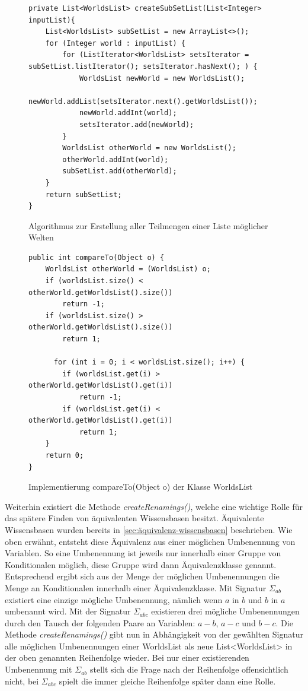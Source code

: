 \documentclass[12pt,a4paper]{article}
\begin{document}
\begin{figure}
\begin{lstlisting}
private List<WorldsList> createSubSetList(List<Integer> inputList){
    List<WorldsList> subSetList = new ArrayList<>();
    for (Integer world : inputList) {
        for (ListIterator<WorldsList> setsIterator = subSetList.listIterator(); setsIterator.hasNext(); ) {
            WorldsList newWorld = new WorldsList();
            newWorld.addList(setsIterator.next().getWorldsList());
            newWorld.addInt(world);
            setsIterator.add(newWorld);
        }
        WorldsList otherWorld = new WorldsList();
        otherWorld.addInt(world);
        subSetList.add(otherWorld);
    }
    return subSetList;
}
\end{lstlisting}
\caption{Algorithmus zur Erstellung aller Teilmengen einer Liste möglicher Welten}
\label{code:subsets}
\end{figure}



\begin{figure}
\begin{lstlisting}
public int compareTo(Object o) {
    WorldsList otherWorld = (WorldsList) o;
    if (worldsList.size() < otherWorld.getWorldsList().size())
        return -1;
    if (worldsList.size() > otherWorld.getWorldsList().size())
        return 1;
          
      for (int i = 0; i < worldsList.size(); i++) {
        if (worldsList.get(i) > otherWorld.getWorldsList().get(i))
            return -1;
        if (worldsList.get(i) < otherWorld.getWorldsList().get(i))
            return 1;
    }
    return 0;
}
\end{lstlisting}
\caption{Implementierung compareTo(Object o) der Klasse WorldsList}
\label{code:compare-worldslist}
\end{figure}


Weiterhin existiert die Methode \textit{createRenamings()}, welche eine wichtige Rolle für das spätere Finden von äquivalenten Wissensbasen besitzt. Äquivalente Wissensbasen wurden bereits in  \autoref{sec:äquivalenz-wissensbasen} beschrieben. Wie oben erwähnt, entsteht diese Äquivalenz aus einer möglichen Umbenennung von Variablen. So eine Umbenennung ist jeweils nur innerhalb einer Gruppe von Konditionalen möglich, diese Gruppe wird dann Äquivalenzklasse genannt. Entsprechend ergibt sich aus der Menge der möglichen Umbenennungen die Menge an Konditionalen innerhalb einer Äquivalenzklasse. Mit Signatur $\Sigma_{ab}$ existiert eine einzige mögliche Umbenennung, nämlich wenn $a$ in $b$ und $b$ in $a$ umbenannt wird. Mit der Signatur $\Sigma_{abc}$ existieren drei mögliche Umbenennungen durch den Tausch der folgenden Paare an Variablen: $a-b$, $a-c$ und $b-c$. Die Methode \textit{createRenamings()} gibt nun in Abhängigkeit von der gewählten Signatur alle möglichen Umbenennungen einer WorldsList als neue List<WorldsList> in der oben genannten Reihenfolge wieder. Bei nur einer existierenden Umbenennung mit $\Sigma_{ab}$ stellt sich die Frage nach der Reihenfolge offensichtlich nicht, bei $\Sigma_{abc}$ spielt die immer gleiche Reihenfolge später dann eine Rolle.
\end{document}
